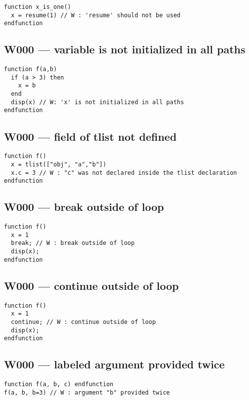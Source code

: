 \begin{verbatim}
function x_is_one()
  x = resume(1) // W : 'resume' should not be used
endfunction
\end{verbatim}


\subsection{W000 --- variable is not initialized in all paths}


\begin{verbatim}
function f(a,b)
  if (a > 3) then
    x = b
  end
  disp(x) // W: 'x' is not initialized in all paths
endfunction
\end{verbatim}


\subsection{W000 --- field of tlist not defined}


\begin{verbatim}
function f()
  x = tlist(["obj", "a","b"])
  x.c = 3 // W : "c" was not declared inside the tlist declaration
endfunction
\end{verbatim}


\subsection{W000 --- break outside of loop}


\begin{verbatim}
function f()
  x = 1
  break; // W : break outside of loop
  disp(x);
endfunction
\end{verbatim}


\subsection{W000 --- continue outside of loop}


\begin{verbatim}
function f()
  x = 1
  continue; // W : continue outside of loop
  disp(x);
endfunction
\end{verbatim}


\subsection{W000 --- labeled argument provided twice}


\begin{verbatim}
function f(a, b, c) endfunction
f(a, b, b=3) // W : argument "b" provided twice
\end{verbatim}


